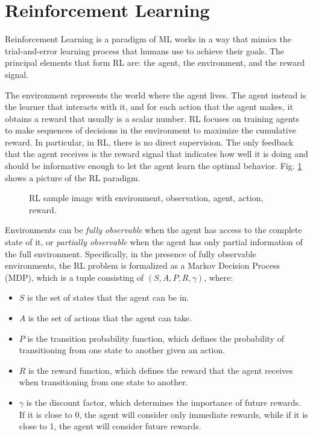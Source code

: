 
\section{Reinforcement Learning}
\label{sec:rl}

Reinforcement Learning is a paradigm of ML works in a way that mimics the trial-and-error learning process that humans use to achieve their goals.
The principal elements that form RL are: the agent, the environment, and the reward signal.

The environment represents the world where the agent lives.
The agent instead is the learner that interacts with it, and for each action that the agent makes, it obtains a reward that usually is a scalar number.
RL focuses on training agents to make sequences of decisions in the environment to maximize the cumulative reward.
In particular, in RL, there is no direct supervision.
The only feedback that the agent receives is the reward signal that indicates how well it is doing and should be informative enough to let the agent learn the optimal behavior.
Fig. \ref{fig:rl} shows a picture of the RL paradigm.


\begin{figure}[ht]
    \begin{center}
        \fbox{\rule[-.5cm]{0cm}{4cm} \rule[-.5cm]{4cm}{0cm}}
    \end{center}
    \caption{RL sample image with environment, observation, agent, action, reward.}
    \label{fig:rl}
\end{figure}


Environments can be \textit{fully observable} when the agent has access to the complete state of it, or \textit{partially observable} when the agent has only partial information of the full environment.
Specifically, in the presence of fully observable environments, the RL problem is formalized as a Markov Decision Process (MDP), which is a tuple consisting of $(S, A, P, R, \gamma)$, where:
\begin{itemize}
    \item $S$ is the set of states that the agent can be in.
    \item $A$ is the set of actions that the agent can take.
    \item $P$ is the transition probability function, which defines the probability of transitioning from one state to another given an action.
    \item $R$ is the reward function, which defines the reward that the agent receives when transitioning from one state to another.
    \item $\gamma$ is the discount factor, which determines the importance of future rewards.
    If it is close to 0, the agent will consider only immediate rewards, while if it is close to 1, the agent will consider future rewards.
\end{itemize}

